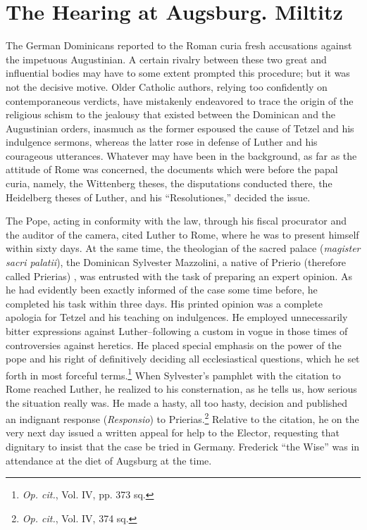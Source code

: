 \section{The Hearing at Augsburg. Miltitz}

The German Dominicans reported to the Roman curia fresh accusations
against the impetuous Augustinian. A certain rivalry between
these two great and influential bodies may have to some extent
prompted this procedure; but it was not the decisive motive. Older
Catholic authors, relying too confidently on contemporaneous verdicts,
have mistakenly endeavored to trace the origin of the religious
schism to the jealousy that existed between the Dominican and the
Augustinian orders, inasmuch as the former espoused the cause of
Tetzel and his indulgence sermons, whereas the latter rose in defense
of Luther and his courageous utterances. Whatever may have been in
the background, as far as the attitude of Rome was concerned, the
documents which were before the papal curia, namely, the Wittenberg theses,
the disputations conducted there, the Heidelberg theses
of Luther, and his “Resolutiones,” decided the issue.

The Pope, acting in conformity with the law, through his fiscal
procurator and the auditor of the camera, cited Luther to Rome,
where he was to present himself within sixty days. At the same time,
the theologian of the sacred palace (\textit{magister sacri palatii}), the
Dominican Sylvester Mazzolini, a native of Prierio (therefore called
Prierias) , was entrusted with the task of preparing an expert opinion.
As he had evidently been exactly informed of the case some time
before, he completed his task within three days. His printed opinion
was a complete apologia for Tetzel and his teaching on indulgences.
He employed unnecessarily bitter expressions against Luther--following
a custom in vogue in those times of controversies against heretics. He
placed special emphasis on the power of the pope and his right
of definitively deciding all ecclesiastical questions, which he set forth
in most forceful terms.\footnote{\textit{Op. cit.}, Vol. IV, pp. 373 sq.}
When Sylvester’s pamphlet with the citation
to Rome reached Luther, he realized to his consternation, as he tells
us, how serious the situation really was. He made a hasty, all too
hasty, decision and published an indignant response (\textit{Responsio}) to
Prierias.\footnote{\textit{Op. cit.}, Vol. IV, 374 sq.}
Relative to the citation, he on the very next day issued a
written appeal for help to the Elector, requesting that dignitary
to insist that the case be tried in Germany. Frederick “the Wise”
was in attendance at the diet of Augsburg at the time.

